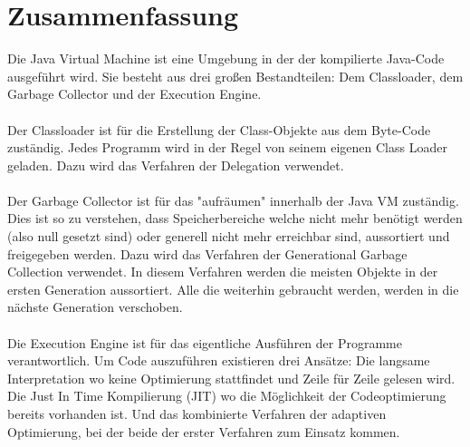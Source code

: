 \documentclass[a4paper,14pt]{scrreprt}
\begin{document}
\chapter{Zusammenfassung}
Die Java Virtual Machine ist eine Umgebung in der der kompilierte Java-Code ausgeführt wird. Sie besteht aus drei großen Bestandteilen: Dem Classloader, dem Garbage Collector und der Execution Engine. \\\\Der Classloader ist für die Erstellung der Class-Objekte aus dem Byte-Code zuständig. Jedes Programm wird in der Regel von seinem eigenen Class Loader geladen. Dazu wird das Verfahren der Delegation verwendet.\\\\Der Garbage Collector ist für das "aufräumen" innerhalb der Java VM zuständig. Dies ist so zu verstehen, dass Speicherbereiche welche nicht mehr benötigt werden (also null gesetzt sind) oder generell nicht mehr erreichbar sind, aussortiert und freigegeben werden. Dazu wird das Verfahren der Generational Garbage Collection verwendet. In diesem Verfahren werden die meisten Objekte in der ersten Generation aussortiert. Alle die weiterhin gebraucht werden, werden in die nächste Generation verschoben.\\\\Die Execution Engine ist für das eigentliche Ausführen der Programme verantwortlich. Um Code auszuführen existieren drei Ansätze: Die langsame Interpretation wo keine Optimierung stattfindet und Zeile für Zeile gelesen wird. Die Just In Time Kompilierung (JIT) wo die Möglichkeit der Codeoptimierung bereits vorhanden ist. Und das kombinierte Verfahren der adaptiven Optimierung, bei der beide der erster Verfahren zum Einsatz kommen.

\end{document}

